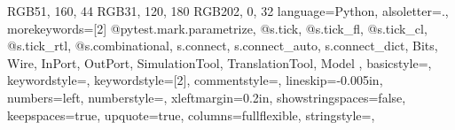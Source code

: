 
\definecolor{dmlgreen}    {RGB}{51,  160,  44}
\definecolor{dmlblue}     {RGB}{31,  120, 180}
\definecolor{dmlred}      {RGB}{202,   0,  32}
\lstset
{%
  language=Python,%
  alsoletter={.},
  morekeywords=[2]{
    @pytest.mark.parametrize,
    @s.tick,
    @s.tick_fl,
    @s.tick_cl,
    @s.tick_rtl,
    @s.combinational,
    s.connect,
    s.connect_auto,
    s.connect_dict,
    Bits,
    Wire,
    InPort,
    OutPort,
    SimulationTool,
    TranslationTool,
    Model
  },
  basicstyle={\ttfamily\footnotesize},%
  keywordstyle={\color{cbxgreenC}},%
  keywordstyle={[2]\color{cbxblueC}},%
  commentstyle={\color{cbxredC}},
  lineskip={-0.005in},%
  numbers={left},%
  numberstyle={\tiny},%
  xleftmargin={0.2in},%
  showstringspaces={false},%
  keepspaces={true},%
  upquote={true},%
  columns={fullflexible},%
  stringstyle={\color{brown}},%
}%

